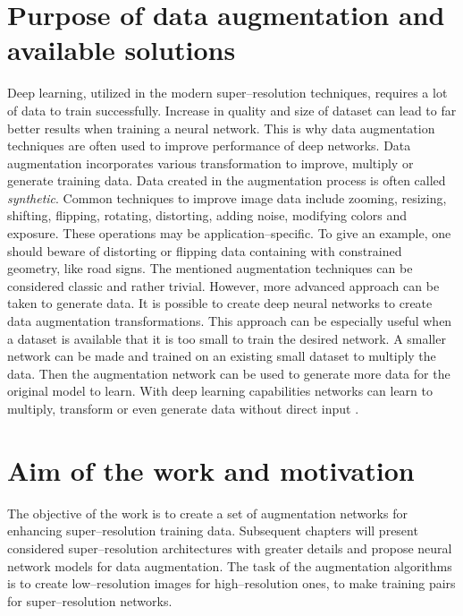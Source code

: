 \section{Purpose of data augmentation and available solutions}
Deep learning, utilized in the modern super--resolution techniques, requires a
lot of data to train successfully.
Increase in quality and size of dataset can lead to far better results when
training a neural network.
This is why data augmentation techniques are often used to improve performance
of deep networks.
Data augmentation incorporates various transformation to improve, multiply or
generate training data.
Data created in the augmentation process is often called \textit{synthetic}.
Common techniques to improve image data include zooming, resizing, shifting,
flipping, rotating, distorting, adding noise, modifying colors and exposure.
These operations may be application--specific.
To give an example, one should beware of distorting or flipping data containing with constrained geometry, like road signs.
The mentioned augmentation techniques can be considered classic and rather
trivial.
However, more advanced approach can be taken to generate data.
It is possible to create deep neural networks to create data augmentation
transformations.
This approach can be especially useful when a dataset is available that it is
too small to train the desired network.
A smaller network can be made and trained on an existing small dataset to multiply
the data.
Then the augmentation network can be used to generate more data for the
original model to learn.
With deep learning capabilities networks can learn to multiply, transform or
even generate data without direct input \cite{bulat-2018-supergan}.

\section{Aim of the work and motivation}
The objective of the work is to create a set of augmentation networks for
enhancing super--resolution training data.
Subsequent chapters will present considered super--resolution architectures
with greater details and propose neural network models for data augmentation.
The task of the augmentation algorithms is to create low--resolution images for
high--resolution ones, to make training pairs for super--resolution networks. 

